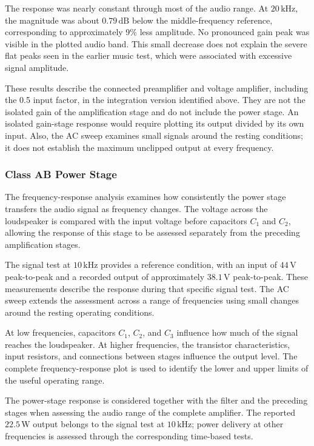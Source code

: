 \documentclass[conference]{IEEEtran}
\begin{document}
The response was nearly constant through most of the audio range. At $20\,\mathrm{kHz}$, the magnitude was about $0.79\,\mathrm{dB}$ below the middle-frequency reference, corresponding to approximately 9\% less amplitude. No pronounced gain peak was visible in the plotted audio band. This small decrease does not explain the severe flat peaks seen in the earlier music test, which were associated with excessive signal amplitude.

These results describe the connected preamplifier and voltage amplifier, including the 0.5 input factor, in the integration version identified above. They are not the isolated gain of the amplification stage and do not include the power stage. An isolated gain-stage response would require plotting its output divided by its own input. Also, the AC sweep examines small signals around the resting conditions; it does not establish the maximum unclipped output at every frequency.

\subsubsection{Class AB Power Stage}
The frequency-response analysis examines how consistently the power stage transfers the audio signal as frequency changes. The voltage across the loudspeaker is compared with the input voltage before capacitors $C_1$ and $C_2$, allowing the response of this stage to be assessed separately from the preceding amplification stages.

The signal test at $10\,\mathrm{kHz}$ provides a reference condition, with an input of $44\,\mathrm{V}$ peak-to-peak and a recorded output of approximately $38.1\,\mathrm{V}$ peak-to-peak. These measurements describe the response during that specific signal test. The AC sweep extends the assessment across a range of frequencies using small changes around the resting operating conditions.

At low frequencies, capacitors $C_1$, $C_2$, and $C_3$ influence how much of the signal reaches the loudspeaker. At higher frequencies, the transistor characteristics, input resistors, and connections between stages influence the output level. The complete frequency-response plot is used to identify the lower and upper limits of the useful operating range.

The power-stage response is considered together with the filter and the preceding stages when assessing the audio range of the complete amplifier. The reported $22.5\,\mathrm{W}$ output belongs to the signal test at $10\,\mathrm{kHz}$; power delivery at other frequencies is assessed through the corresponding time-based tests.
\end{document}
